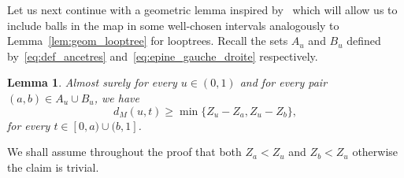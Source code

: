 \documentclass[british, a4paper,11pt]{article}
\numberwithin{equation}{section}
\newtheorem{lem}[thm]{Lemma}
\theoremstyle{definition}
\newcommand{\Map}{M}
\begin{document}
Let us next continue with a geometric lemma inspired by~\cite[Lemma~14]{LGM11} which will allow us to include balls in the map in some well-chosen intervals analogously to Lemma~\ref{lem:geom_looptree} for looptrees.
Recall the sets $A_u$ and $B_u$ defined by~\eqref{eq:def_ancetres} and~\eqref{eq:epine_gauche_droite} respectively.


\begin{lem}\label{lem:geometric_boules_cartes}
Almost surely for every $u \in (0,1)$ and for every pair $(a,b) \in A_u \cup B_u$, we have
\[d_\Map(u,t) \geq \min\{Z_{u}-Z_{a}, Z_{u}-Z_{b}\},\]
for every $t \in [0,a) \cup (b, 1]$.
\end{lem}

We shall assume throughout the proof that both $Z_{a} < Z_u$ and $Z_{b} < Z_{u}$ otherwise the claim is trivial.
\end{document}
